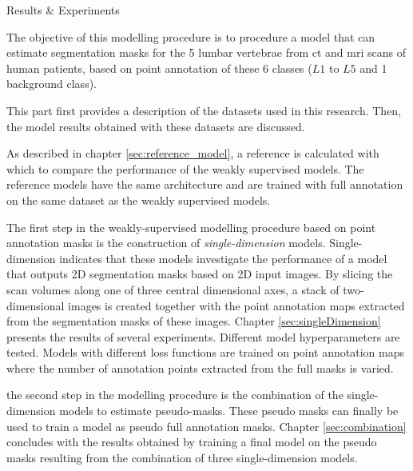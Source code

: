 
\begin{partwithabstract}{\hspace{2mm}Results \& Experiments\label{part:results}}
    \par{
    The objective of this modelling procedure is to procedure a model that can estimate segmentation masks for the 5 lumbar vertebrae from \acrfull{ct} and \acrfull{mri} scans of human patients, 
    based on point annotation of these 6 classes ($L1$ to $L5$ and 1 background class).
}
\par{
    This part first provides a description of the datasets used in this research. Then, the model results obtained with these datasets are discussed.
}
\par{
    As described in chapter \ref{sec:reference_model}, a reference is calculated with which to compare the performance of the weakly supervised models.
    The reference models have the same architecture and are trained with full annotation on the same dataset as the weakly supervised models. 
}
\par{
    The first step in the weakly-supervised modelling procedure based on point annotation masks is the construction of \textit{single-dimension} models.
    Single-dimension indicates that these models investigate the performance of a model that outputs 2D segmentation masks based on 2D input images.
    By slicing the scan volumes along one of three central dimensional axes, a stack of two-dimensional images is created together with the point annotation maps extracted from the segmentation masks of these images.
    Chapter \ref{sec:singleDimension} presents the results of several experiments. 
    Different model hyperparameters are tested.
    Models with different loss functions are trained on point annotation maps where the number of annotation points extracted from the full masks is varied.
}
\par{
    the second step in the modelling procedure is the combination of the single-dimension models to estimate pseudo-masks.
    These pseudo masks can finally be used to train a model as pseudo full annotation masks.
    Chapter \ref{sec:combination} concludes with the results obtained by training a final model on the pseudo masks resulting from the combination of three single-dimension models.
}
\end{partwithabstract}
\restoregeometry







